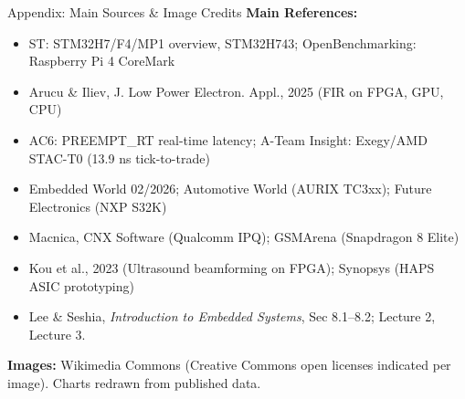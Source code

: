 \begin{frame}{Appendix: Main Sources \& Image Credits}
\tiny
\textbf{Main References:}
\begin{itemize}\setlength{\itemsep}{1pt}
\item ST: STM32H7/F4/MP1 overview, STM32H743; OpenBenchmarking: Raspberry Pi 4 CoreMark
\item Arucu \& Iliev, J. Low Power Electron. Appl., 2025 (FIR on FPGA, GPU, CPU)
\item AC6: PREEMPT\_RT real-time latency; A-Team Insight: Exegy/AMD STAC-T0 (13.9 ns tick-to-trade)
\item Embedded World 02/2026; Automotive World (AURIX TC3xx); Future Electronics (NXP S32K)
\item Macnica, CNX Software (Qualcomm IPQ); GSMArena (Snapdragon 8 Elite)
\item Kou et al., 2023 (Ultrasound beamforming on FPGA); Synopsys (HAPS ASIC prototyping)
\item Lee \& Seshia, \emph{Introduction to Embedded Systems}, Sec 8.1–8.2; Lecture 2, Lecture 3.
\end{itemize}
\par\smallskip
\textbf{Images:} Wikimedia Commons (Creative Commons open licenses indicated per image). Charts redrawn from published data.
\end{frame}

